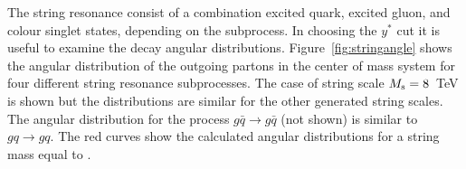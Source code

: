 The string resonance consist of a combination excited quark, excited
gluon, and colour singlet states, depending on the subprocess.
In choosing the $y^*$ cut it is useful to examine the decay angular
distributions. 
Figure~\ref{fig:stringangle} shows the angular distribution of the outgoing partons
in the center of mass system for four different string resonance
subprocesses. 
The case of string scale $M_\mathrm{s} = 8$~TeV is shown but the distributions
are similar for the other generated string scales.
The angular distribution for the process $g\bar{q}\to g\bar{q}$ (not
shown) is similar to $gq\to gq$.
The red curves show the calculated angular distributions for a string
mass equal to \Ms.
